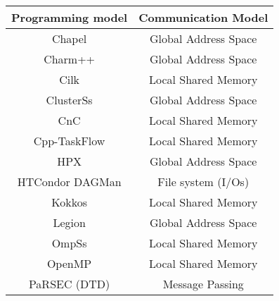 \begin{tabular}{cc}
\hline
Programming model & Communication Model \\
\hline
Chapel & Global Address Space\\
Charm++ & Global Address Space\\
Cilk & Local Shared Memory\\
ClusterSs & Global Address Space\\
CnC & Local Shared Memory\\
Cpp-TaskFlow & Local Shared Memory\\
HPX & Global Address Space\\
HTCondor DAGMan & File system (I/Os)\\
Kokkos & Local Shared Memory\\
Legion & Global Address Space\\
OmpSs & Local Shared Memory\\
OpenMP & Local Shared Memory\\
PaRSEC (DTD) & Message Passing\\
\hline
\end{tabular}
